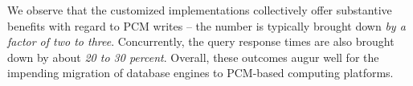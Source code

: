 We observe that the customized implementations collectively offer
substantive benefits with regard to PCM writes -- the number is typically
brought down \emph{by a factor of two to three}.  Concurrently, the query
response times are also brought down by about \emph{20 to 30 percent}. Overall, these outcomes augur well for the impending migration of database
engines to PCM-based computing platforms.

 
 
 
\begin{comment}
 Our 

The experimental results suggest that, as compared to the original
PCM-oblivious operators, 
As a sample case in point, for TPC-H Query 19, savings of 64\% in PCM
writes are achieved with a concomitant 32\% reduction in CPU cycles.

A unique feature of our analysis is that we also . This is because
a skewed distribution adversely impacts the endurance of cells with high
write rates, raising the frequency at which wear-leveling mechanisms
have to be put into play by the system. We observe that our algorithms don't introduce any new skew while achieving the reduction in writes and cycles.

Finally, 

In a nutshell, the new PCM-conscious operators proposed in this paper
provide both \emph{short-term and long-term performance benefits}.

\end{comment}